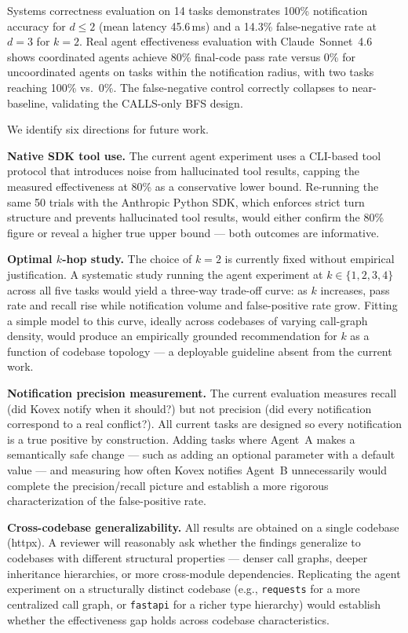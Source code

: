 \documentclass[12pt]{article}
\begin{document}
Systems correctness evaluation on 14 tasks demonstrates 100\% notification
accuracy for $d \leq 2$ (mean latency 45.6\,ms) and a 14.3\% false-negative
rate at $d=3$ for $k=2$. Real agent effectiveness evaluation with
Claude~Sonnet~4.6 shows coordinated agents achieve 80\% final-code pass rate
versus 0\% for uncoordinated agents on tasks within the notification radius,
with two tasks reaching 100\% vs.\ 0\%. The false-negative control correctly
collapses to near-baseline, validating the CALLS-only BFS design.

We identify six directions for future work.

\textbf{Native SDK tool use.}
The current agent experiment uses a CLI-based tool protocol that introduces
noise from hallucinated tool results, capping the measured effectiveness at
80\% as a conservative lower bound. Re-running the same 50 trials with the
Anthropic Python SDK, which enforces strict turn structure and prevents
hallucinated tool results, would either confirm the 80\% figure or reveal
a higher true upper bound --- both outcomes are informative.

\textbf{Optimal $k$-hop study.}
The choice of $k=2$ is currently fixed without empirical justification.
A systematic study running the agent experiment at $k \in \{1,2,3,4\}$
across all five tasks would yield a three-way trade-off curve: as $k$
increases, pass rate and recall rise while notification volume and false-positive
rate grow. Fitting a simple model to this curve, ideally across codebases of
varying call-graph density, would produce an empirically grounded recommendation
for $k$ as a function of codebase topology --- a deployable guideline absent
from the current work.

\textbf{Notification precision measurement.}
The current evaluation measures recall (did Kovex notify when it should?) but
not precision (did every notification correspond to a real conflict?). All
current tasks are designed so every notification is a true positive by
construction. Adding tasks where Agent~A makes a semantically safe change
--- such as adding an optional parameter with a default value --- and measuring
how often Kovex notifies Agent~B unnecessarily would complete the precision/recall
picture and establish a more rigorous characterization of the false-positive rate.

\textbf{Cross-codebase generalizability.}
All results are obtained on a single codebase (httpx). A reviewer will
reasonably ask whether the findings generalize to codebases with different
structural properties --- denser call graphs, deeper inheritance hierarchies,
or more cross-module dependencies. Replicating the agent experiment on a
structurally distinct codebase (e.g., \texttt{requests} for a more centralized
call graph, or \texttt{fastapi} for a richer type hierarchy) would establish
whether the effectiveness gap holds across codebase characteristics.
\end{document}
